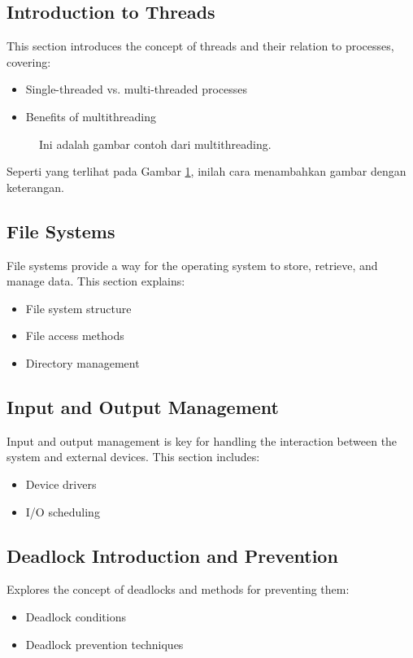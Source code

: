 \documentclass[12pt]{article}
\begin{document}
\subsection{Introduction to Threads}
This section introduces the concept of threads and their relation to processes, covering:
\begin{itemize}
    \item Single-threaded vs. multi-threaded processes
    \item Benefits of multithreading
\end{itemize}

\begin{figure}[h]
    \centering
    \caption{Ini adalah gambar contoh dari multithreading.}
    \label{fig:contoh_gambar}
\end{figure}

Seperti yang terlihat pada Gambar \ref{fig:contoh_gambar}, inilah cara menambahkan gambar dengan keterangan.

\subsection{File Systems}
File systems provide a way for the operating system to store, retrieve, and manage data. This section explains:
\begin{itemize}
    \item File system structure
    \item File access methods
    \item Directory management
\end{itemize}

\subsection{Input and Output Management}
Input and output management is key for handling the interaction between the system and external devices. This section includes:
\begin{itemize}
    \item Device drivers
    \item I/O scheduling
\end{itemize}

\subsection{Deadlock Introduction and Prevention}
Explores the concept of deadlocks and methods for preventing them:
\begin{itemize}
    \item Deadlock conditions
    \item Deadlock prevention techniques
\end{itemize}
\end{document}
